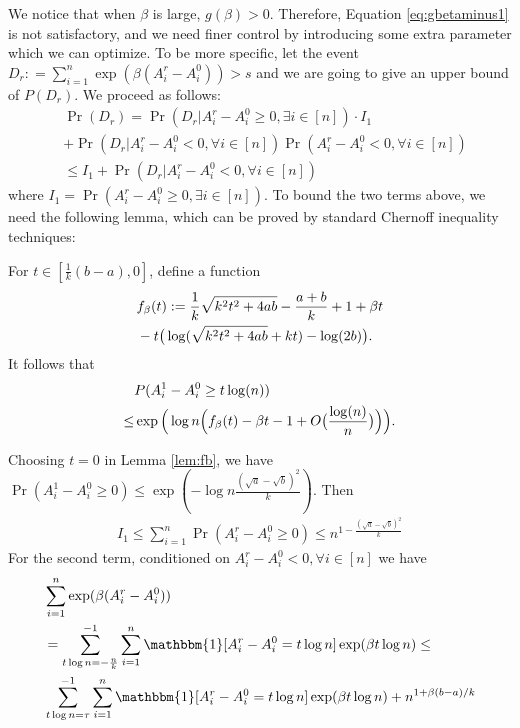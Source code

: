 \documentclass{article}
\begin{document}
We notice that when $\beta$ is large, $g(\beta) > 0$. Therefore, Equation \eqref{eq:gbetaminus1} is not satisfactory, and
we need finer control by introducing some extra parameter which we can optimize. To be more specific, let
the event $D_r : = \sum_{i=1}^n\exp ( \beta(A^r_i-A^0_i)) > s$
and we are going to give an upper bound of $P(D_r)$. We proceed as follows: 
\begin{align*}
&\Pr(D_r) = 
\Pr(D_r| A_i^r - A_i^0 \geq 0, \exists i\in [n])
\cdot I_1 \\
&+ \Pr(D_r | A_i^r - A_i^0  < 0, \forall i\in [n])
\Pr(  A_i^r - A_i^0  < 0 , \forall i \in [n] ) \\
& \leq I_1
+ \Pr(D_r | A_i^r - A_i^0  < 0, \forall i\in [n])
\end{align*}
where $I_1 = \Pr( A_i^r - A_i^0 \geq 0, \exists i\in [n])$.
To bound the two terms above, we need the following lemma, which can be proved by standard Chernoff inequality techniques:
\begin{lemma}\label{lem:fb}
	For $t\in [\frac{1}{k}(b-a), 0]$,
	define a function
	\begin{align}
	&f_{\beta}(t):=\frac{1}{k}\sqrt{k^2t^2+4ab} -\frac{a+b}{k} +1 +\beta t  \notag\\
	&-t\big(\log(\sqrt{k^2t^2+4ab}+kt)-\log(2b) \big). \label{eq:fbetat}
	\end{align}
	It follows that
	\begin{align} 
	& P(A^1_i-A^0_i\ge t\log(n))  \notag\\
	\le &  \exp\Big(\log n \Big(f_{\beta}(t) -\beta t  - 1 + O\big(\frac{\log(n)}{n}\big) \Big)\Big) .
	\end{align}
\end{lemma}
Choosing $t=0$ in Lemma \ref{lem:fb}, we have
$\Pr(A^1_i-A^0_i\ge 0 ) \leq \exp(-\log n \frac{(\sqrt{a}-\sqrt{b})^2}{k})$.
Then
\begin{align*}
I_1 \leq \sum_{i=1}^n \Pr( A_i^r - A_i^0 \geq 0) \leq n^{1-\frac{(\sqrt{a}-\sqrt{b})^2}{k}}
\end{align*}
For the second term,
conditioned on $A_i^r - A_i^0  < 0, \forall i\in [n]$ we have
\begin{align*}
&\sum_{i=1}^n\exp ( \beta(A^r_i-A^0_i)) \\
& = \sum_{t\log n =-\frac{n}{k}}^{-1}\sum_{i=1}^n \mathbbm{1}[A^r_i - A^0_i = t \log n] \exp ( \beta  t\log n)\leq \\ 
&
\sum_{t\log n =\tau}^{-1}\sum_{i=1}^n \mathbbm{1}[A^r_i - A^0_i = t \log n]\exp ( \beta  t\log n) + n^{1+\beta(b-a)/k}
\end{align*}
\end{document}
